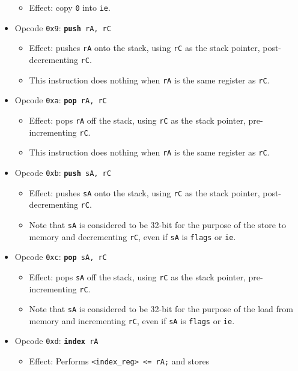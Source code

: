 \documentclass{article}
\begin{document}
\begin{itemize}
\begin{itemize}
			\item Effect:  copy \texttt{0} into \texttt{ie}.
		\end{itemize}
		\item Opcode \texttt{0x9}:
			\texttt{\textbf{push} rA, rC}
		\begin{itemize}
			\item Effect:  pushes \texttt{rA} onto the stack, using
			\texttt{rC} as the stack pointer, post-decrementing
			\texttt{rC}.
			\item This instruction does nothing when \texttt{rA} is the
			same register as \texttt{rC}. 
		\end{itemize}
		\item Opcode \texttt{0xa}:
			\texttt{\textbf{pop} rA, rC}
		\begin{itemize}
			\item Effect:  pops \texttt{rA} off the stack, using
			\texttt{rC} as the stack pointer, pre-incrementing \texttt{rC}.
			\item This instruction does nothing when \texttt{rA} is the
			same register as \texttt{rC}. 
		\end{itemize}
		\item Opcode \texttt{0xb}:
			\texttt{\textbf{push} sA, rC}
		\begin{itemize}
			\item Effect:  pushes \texttt{sA} onto the stack, using
			\texttt{rC} as the stack pointer, post-decrementing
			\texttt{rC}.
			\item Note that \texttt{sA} is considered to be 32-bit for the
			purpose of the store to memory and decrementing \texttt{rC},
			even if \texttt{sA} is \texttt{flags} or \texttt{ie}.
		\end{itemize}
		\item Opcode \texttt{0xc}:
			\texttt{\textbf{pop} sA, rC}
		\begin{itemize}
			\item Effect:  pops \texttt{sA} off the stack, using
			\texttt{rC} as the stack pointer, pre-incrementing \texttt{rC}.
			\item Note that \texttt{sA} is considered to be 32-bit for the
			purpose of the load from memory and incrementing \texttt{rC},
			even if \texttt{sA} is \texttt{flags} or \texttt{ie}.
		\end{itemize}
		\item Opcode \texttt{0xd}:
			\texttt{\textbf{index} rA}
		\begin{itemize}
			\item Effect:  Performs \texttt{<index\_reg> <= rA;} and stores

\end{itemize}
\end{itemize}
\end{document}
